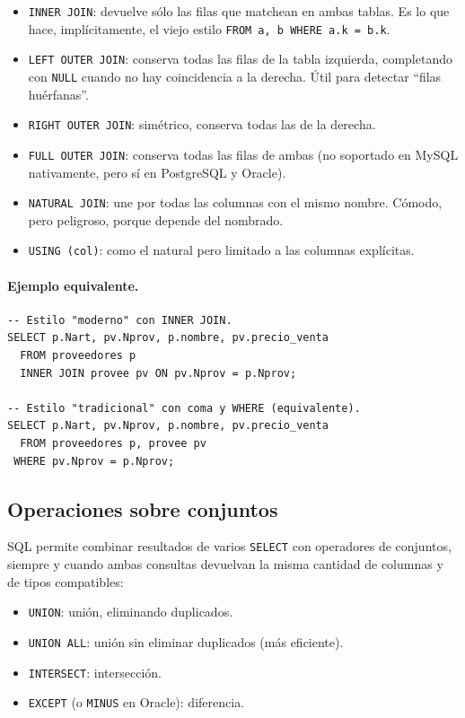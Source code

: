 \documentclass[11pt,a4paper]{article}
\begin{document}
\begin{itemize}
    \item \texttt{INNER JOIN}: devuelve sólo las filas que matchean en ambas
    tablas. Es lo que hace, implícitamente, el viejo estilo
    \texttt{FROM a, b WHERE a.k = b.k}.
    \item \texttt{LEFT OUTER JOIN}: conserva todas las filas de la tabla
    izquierda, completando con \texttt{NULL} cuando no hay coincidencia
    a la derecha. Útil para detectar ``filas huérfanas''.
    \item \texttt{RIGHT OUTER JOIN}: simétrico, conserva todas las de la
    derecha.
    \item \texttt{FULL OUTER JOIN}: conserva todas las filas de ambas
    (no soportado en MySQL nativamente, pero sí en PostgreSQL y Oracle).
    \item \texttt{NATURAL JOIN}: une por todas las columnas con el mismo
    nombre. Cómodo, pero peligroso, porque depende del nombrado.
    \item \texttt{USING (col)}: como el natural pero limitado a las columnas
    explícitas.
\end{itemize}

\paragraph{Ejemplo equivalente.}

\begin{lstlisting}
-- Estilo "moderno" con INNER JOIN.
SELECT p.Nart, pv.Nprov, p.nombre, pv.precio_venta
  FROM proveedores p
  INNER JOIN provee pv ON pv.Nprov = p.Nprov;

-- Estilo "tradicional" con coma y WHERE (equivalente).
SELECT p.Nart, pv.Nprov, p.nombre, pv.precio_venta
  FROM proveedores p, provee pv
 WHERE pv.Nprov = p.Nprov;
\end{lstlisting}

\subsection{Operaciones sobre conjuntos}

SQL permite combinar resultados de varios \texttt{SELECT} con operadores de
conjuntos, siempre y cuando ambas consultas devuelvan la misma cantidad de
columnas y de tipos compatibles:

\begin{itemize}
    \item \texttt{UNION}: unión, eliminando duplicados.
    \item \texttt{UNION ALL}: unión sin eliminar duplicados (más eficiente).
    \item \texttt{INTERSECT}: intersección.
    \item \texttt{EXCEPT} (o \texttt{MINUS} en Oracle): diferencia.
\end{itemize}
\end{document}

